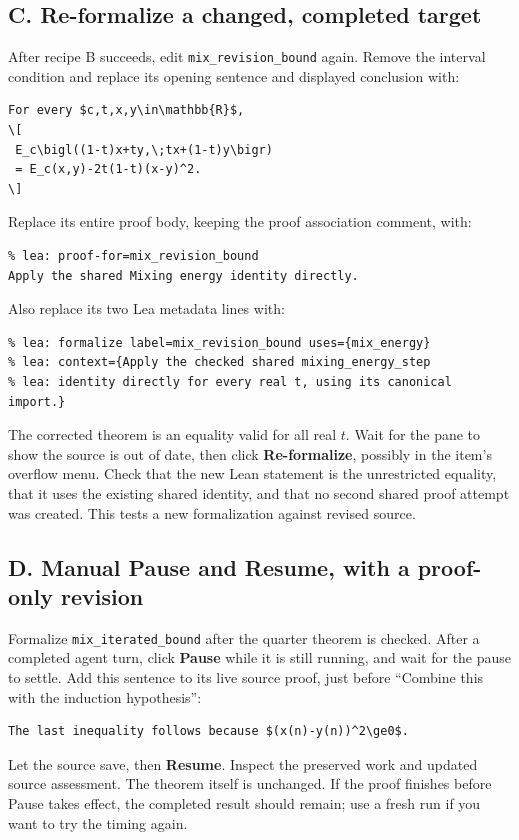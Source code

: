 \documentclass[11pt]{article}
\newcommand{\code}[1]{\texttt{#1}}
\begin{document}
\subsection*{C. Re-formalize a changed, completed target}
After recipe B succeeds, edit \code{mix\_revision\_bound} again.
Remove the interval condition and replace its opening sentence and
displayed conclusion with:
\begin{verbatim}
For every $c,t,x,y\in\mathbb{R}$,
\[
 E_c\bigl((1-t)x+ty,\;tx+(1-t)y\bigr)
 = E_c(x,y)-2t(1-t)(x-y)^2.
\]
\end{verbatim}
Replace its entire proof body, keeping the proof association comment, with:
\begin{verbatim}
% lea: proof-for=mix_revision_bound
Apply the shared Mixing energy identity directly.
\end{verbatim}
Also replace its two Lea metadata lines with:
\begin{verbatim}
% lea: formalize label=mix_revision_bound uses={mix_energy}
% lea: context={Apply the checked shared mixing_energy_step
% lea: identity directly for every real t, using its canonical import.}
\end{verbatim}
The corrected theorem is an equality valid for
all real $t$. Wait for the pane to show the source is out of date, then
click \textbf{Re-formalize}, possibly in the item's overflow menu.
Check that the new Lean statement is the unrestricted equality, that it
uses the existing shared identity, and that no second shared proof attempt
was created. This tests a new formalization against revised source.

\subsection*{D. Manual Pause and Resume, with a proof-only revision}
Formalize \code{mix\_iterated\_bound} after the quarter theorem is checked.
After a completed agent turn, click \textbf{Pause} while it is still running,
and wait for the pause to settle. Add this sentence to its live source proof,
just before ``Combine this with the induction hypothesis'':
\begin{verbatim}
The last inequality follows because $(x(n)-y(n))^2\ge0$.
\end{verbatim}
Let the source save, then \textbf{Resume}. Inspect the preserved work and
updated source assessment. The theorem itself is unchanged. If the proof
finishes before Pause takes effect, the completed result should remain;
use a fresh run if you want to try the timing again.
\end{document}
